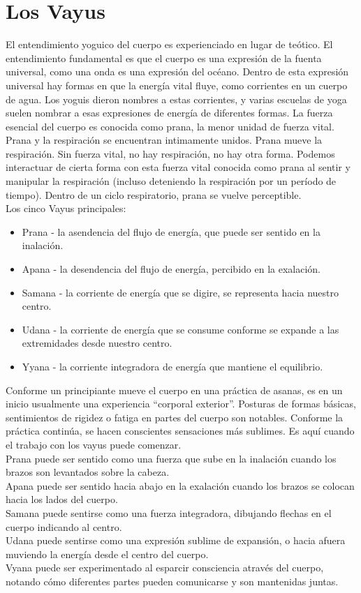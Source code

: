 \section{Los Vayus}
El entendimiento yoguico del cuerpo es experienciado en lugar de teótico. El entendimiento fundamental es que el cuerpo es una expresión de la fuenta universal, como una onda es una expresión del oc\'eano.  Dentro de esta expresión universal hay formas en que la energía vital fluye, como corrientes en un cuerpo de agua. Los yoguis dieron nombres a estas corrientes, y varias escuelas de yoga suelen nombrar a esas expresiones de energía de diferentes formas. La fuerza esencial del cuerpo es conocida como prana, la menor unidad de fuerza vital.\\
Prana y la respiración se encuentran intimamente unidos. Prana mueve la respiración. Sin fuerza vital, no hay respiración, no hay otra forma. Podemos interactuar de cierta forma con esta fuerza vital conocida como prana al sentir y manipular la respiración (incluso deteniendo la respiración por un período de tiempo). Dentro de un ciclo respiratorio, prana se vuelve perceptible.\\
Los cinco Vayus principales:
\begin{itemize}
	\item Prana - la asendencia del flujo de energía, que puede ser sentido en la inalación.
	\item Apana - la desendencia del flujo de energía, percibido en la exalación.
	\item Samana - la corriente de energía que se digire, se representa hacia nuestro centro.
	\item Udana - la corriente de energía que se consume conforme se expande a las extremidades desde nuestro centro.
	\item Yyana - la corriente integradora de energía que mantiene el equilibrio.
\end {itemize}
Conforme un principiante mueve el cuerpo en una práctica de asanas, es en un inicio usualmente una experiencia ``corporal exterior''. Posturas de formas básicas, sentimientos de rigidez o fatiga en partes del cuerpo son notables. Conforme la práctica continúa, se hacen conscientes  sensaciones más sublimes. Es aquí cuando el trabajo con los vayus puede comenzar.\\
Prana puede ser sentido como una fuerza que sube en la inalación cuando los brazos son levantados sobre la cabeza.\\
Apana puede ser sentido hacia abajo en la exalación cuando los brazos se colocan hacia los lados del cuerpo.\\
Samana puede sentirse como una fuerza integradora, dibujando flechas en el cuerpo indicando al centro.\\
Udana puede sentirse como una expresión sublime de expansión, o hacia afuera muviendo la energía desde el centro del cuerpo.\\
Vyana puede ser experimentado al esparcir consciencia atrav\'es del cuerpo, notando cómo diferentes partes pueden comunicarse y son mantenidas juntas.
